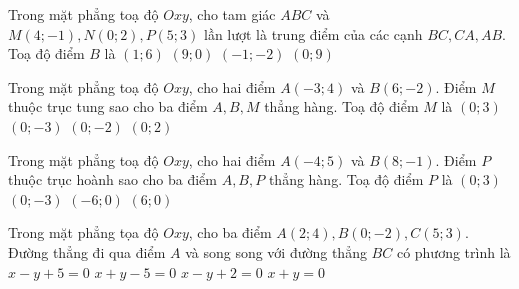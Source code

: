 \begin{ex}%
	Trong mặt phẳng toạ độ $O x y$, cho tam giác $A B C$ và $M(4;-1), N(0; 2), P(5; 3)$ lần lượt là trung điểm của các cạnh $B C, C A, A B$. Toạ độ điểm $B$ là
	\choice
	{$(1; 6)$}
	{\True $(9; 0)$}
	{$(-1;-2)$}
	{$(0; 9)$}
\end{ex}
\begin{ex}%
	Trong mặt phẳng toạ độ $O x y$, cho hai điểm $A(-3; 4)$ và $B(6;-2)$. Điểm $M$ thuộc trục tung sao cho ba điểm $A, B, M$ thẳng hàng. Toạ độ điểm $M$ là
	\choice
	{$(0; 3)$}
	{$(0;-3)$}
	{$(0;-2)$}
	{\True $(0; 2)$}
\end{ex}
\begin{ex}%
	Trong mặt phẳng toạ độ $O x y$, cho hai điểm $A(-4; 5)$ và $B(8;-1)$. Điểm $P$ thuộc trục hoành sao cho ba điểm $A, B, P$ thẳng hàng. Toạ độ điểm $P$ là
	\choice
	{$(0; 3)$}
	{$(0;-3)$}
	{$(-6; 0)$}
	{$(6; 0)$}
\end{ex}
\begin{ex}%
	Trong mặt phẳng tọa độ $O x y$, cho ba điểm $A(2; 4), B(0;-2), C(5; 3)$. Đường thẳng đi qua điểm $A$ và song song với đường thẳng $B C$ có phương trình là
	\choice
	{$x-y+5=0$}
	{$x+y-5=0$}
	{\True $x-y+2=0$}
	{$x+y=0$}
\end{ex}
